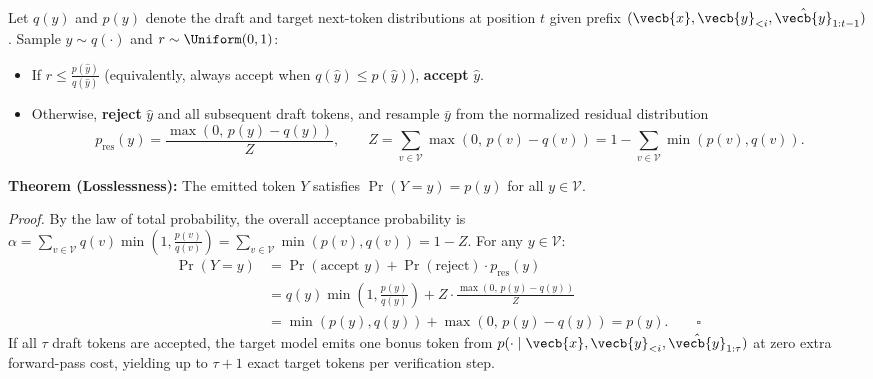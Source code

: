\documentclass[../../../../master.tex]{subfiles}
\begin{document}
\begin{coremath}
Let $q(y)$ and $p(y)$ denote the draft and target next-token distributions at position $t$ given prefix $(\vecb{x}, \vecb{y}_{<i}, \hat{\vecb{y}}_{1:t-1})$. Sample $\hat{y} \sim q(\cdot)$ and $r \sim \Uniform(0, 1)$:
\begin{itemize}
  \item If $r \le \frac{p(\hat{y})}{q(\hat{y})}$ (equivalently, always accept when $q(\hat{y}) \le p(\hat{y})$), \textbf{accept} $\hat{y}$.
  \item Otherwise, \textbf{reject} $\hat{y}$ and all subsequent draft tokens, and resample $\bar{y}$ from the normalized residual distribution
  \begin{equation}\label{eq:decode:residual_dist}
    p_{\mathrm{res}}(y) = \frac{\max(0,\, p(y) - q(y))}{Z}, \qquad Z = \sum_{v \in \mathcal{V}} \max(0,\, p(v) - q(v)) = 1 - \sum_{v \in \mathcal{V}} \min(p(v), q(v)).
  \end{equation}
\end{itemize}
\textbf{Theorem (Losslessness):} The emitted token $Y$ satisfies $\Pr(Y = y) = p(y)$ for all $y \in \mathcal{V}$.

\emph{Proof.} By the law of total probability, the overall acceptance probability is $\alpha = \sum_{v \in \mathcal{V}} q(v) \min\!\left(1, \frac{p(v)}{q(v)}\right) = \sum_{v \in \mathcal{V}} \min(p(v), q(v)) = 1 - Z$. For any $y \in \mathcal{V}$:
\begin{align}
  \Pr(Y = y) &= \Pr(\text{accept } y) + \Pr(\text{reject}) \cdot p_{\mathrm{res}}(y) \nonumber \\
  &= q(y)\min\!\left(1, \frac{p(y)}{q(y)}\right) + Z \cdot \frac{\max(0,\, p(y) - q(y))}{Z} \nonumber \\
  &= \min(p(y), q(y)) + \max(0,\, p(y) - q(y)) = p(y). \qquad \square \label{eq:decode:lossless_proof}
\end{align}
If all $\tau$ draft tokens are accepted, the target model emits one bonus token from $p(\cdot \mid \vecb{x}, \vecb{y}_{<i}, \hat{\vecb{y}}_{1:\tau})$ at zero extra forward-pass cost, yielding up to $\tau + 1$ exact target tokens per verification step.
\end{coremath}
\end{document}
